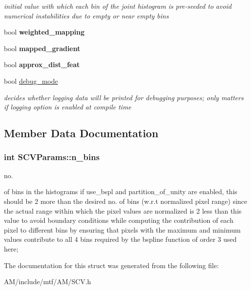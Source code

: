 \begin{DoxyCompactItemize}
\begin{DoxyCompactList}\small\item\em initial value with which each bin of the joint histogram is pre-\/seeded to avoid numerical instabilities due to empty or near empty bins \end{DoxyCompactList}\item 
\hypertarget{structSCVParams_adbfedb8f2955cb3160c98a8823b7ce54}{bool {\bfseries weighted\-\_\-mapping}}\label{structSCVParams_adbfedb8f2955cb3160c98a8823b7ce54}

\item 
\hypertarget{structSCVParams_a6852c8b8509d757e624584a2dbddd5fc}{bool {\bfseries mapped\-\_\-gradient}}\label{structSCVParams_a6852c8b8509d757e624584a2dbddd5fc}

\item 
\hypertarget{structSCVParams_ae72d41d16b1227dd256b84a7da7971b5}{bool {\bfseries approx\-\_\-dist\-\_\-feat}}\label{structSCVParams_ae72d41d16b1227dd256b84a7da7971b5}

\item 
\hypertarget{structSCVParams_a1a68482e17a0eca272c6bb400b886480}{bool \hyperlink{structSCVParams_a1a68482e17a0eca272c6bb400b886480}{debug\-\_\-mode}}\label{structSCVParams_a1a68482e17a0eca272c6bb400b886480}

\begin{DoxyCompactList}\small\item\em decides whether logging data will be printed for debugging purposes; only matters if logging option is enabled at compile time \end{DoxyCompactList}\end{DoxyCompactItemize}


\subsection{Member Data Documentation}
\hypertarget{structSCVParams_a08402ab19dd0c54cb7a7a069dd850fb1}{
\subsubsection[{n\-\_\-bins}]{\setlength{\rightskip}{0pt plus 5cm}int S\-C\-V\-Params\-::n\-\_\-bins}}\label{structSCVParams_a08402ab19dd0c54cb7a7a069dd850fb1}


no. 

of bins in the histograms if use\-\_\-bspl and partition\-\_\-of\-\_\-unity are enabled, this should be 2 more than the desired no. of bins (w.\-r.\-t normalized pixel range) since the actual range within which the pixel values are normalized is 2 less than this value to avoid boundary conditions while computing the contribution of each pixel to different bins by ensuring that pixels with the maximum and minimum values contribute to all 4 bins required by the bspline function of order 3 used here; 

The documentation for this struct was generated from the following file\-:\begin{DoxyCompactItemize}
\item 
A\-M/include/mtf/\-A\-M/S\-C\-V.\-h\end{DoxyCompactItemize}
